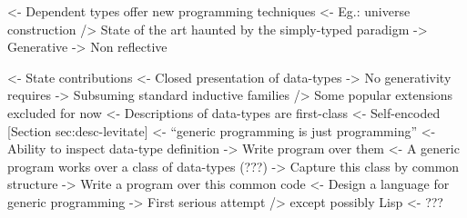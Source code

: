 \documentclass[authoryear]{sigplanconf}
\newenvironment{wstructure}{\comment}{\endcomment}
\begin{document}
%

\begin{wstructure}
    <- Dependent types offer new programming techniques
        <- Eg.: universe construction
        /> State of the art haunted by the simply-typed paradigm
            -> Generative
            -> Non reflective
\end{wstructure}


\begin{wstructure}
<- State contributions
    <- Closed presentation of data-types 
        -> No generativity requires
        -> Subsuming standard inductive families 
            /> Some popular extensions excluded for now
    <- Descriptions of data-types are first-class 
        <- Self-encoded [Section sec:desc-levitate]
    <- ``generic programming is just programming''
        <- Ability to inspect data-type definition
            -> Write program over them
        <- A generic program works over a class of data-types (???)
            -> Capture this class by common structure
            -> Write a program over this common code
    <- Design a language for generic programming
        -> First serious attempt
            /> except possibly Lisp
                <- ???
\end{wstructure}

\end{document}
